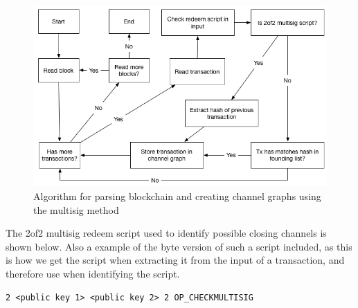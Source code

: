 \begin{figure}[h]
    \centering
    \includegraphics[width=12cm]{figures/algo1.png}
    \caption{Algorithm for parsing blockchain and creating channel graphs using the multisig method}
    \label{fig:algo1}
\end{figure}

The 2of2 multisig redeem script used to identify possible closing channels is shown below. Also a example of the byte version of such a script included, as this is how we get the script when extracting it from the input of a transaction, and therefore use when identifying the script.

\begin{verbatim}
2 <public key 1> <public key 2> 2 OP_CHECKMULTISIG
\end{verbatim}

\noindent [82 33 2 211 153 245 240 225 125 95 140 116 20 99 81 38 139 135 136 59 14 125 34 181 148 47 67 16 42 24 147 28 144 61 33 33 2 215 1 70 141 233 112 91 253 252 202 27 73 158 254 234 159 125 98 30 78 159 235 6 46 167 103 105 239 180 125 168 66 82 174]
\\

